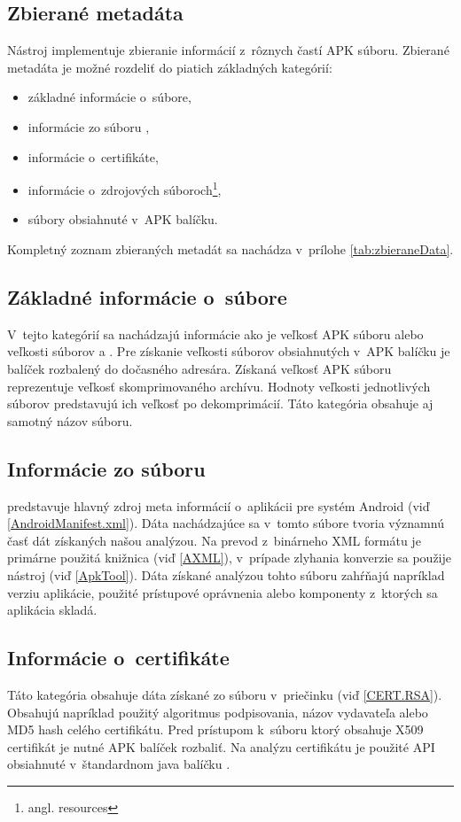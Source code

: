 \subsection{Zbierané metadáta}
Nástroj  implementuje zbieranie informácií z~rôznych častí APK súboru. Zbierané metadáta je možné rozdeliť do piatich základných kategórií:
\begin{itemize}
\item základné informácie o~súbore,
\item informácie zo súboru ,
\item informácie o~certifikáte,
\item informácie o~zdrojových súboroch\footnote{angl. resources},
\item súbory obsiahnuté v~APK balíčku.
\end{itemize}

\noindent Kompletný zoznam zbieraných metadát sa nachádza v~prílohe \ref{tab:zbieraneData}.

\subsection*{Základné informácie o~súbore} 
V~tejto kategórií sa nachádzajú informácie ako je veľkosť APK súboru alebo veľkosti súborov  a . Pre získanie veľkosti súborov obsiahnutých v~APK balíčku je balíček rozbalený do dočasného adresára. Získaná veľkosť APK súboru reprezentuje veľkosť skomprimovaného archívu. Hodnoty veľkosti jednotlivých súborov predstavujú ich veľkosť po dekomprimácií. Táto kategória obsahuje aj samotný názov súboru. 
\subsection*{Informácie zo súboru } 
 predstavuje hlavný zdroj meta informácií o~aplikácii pre systém Android (viď \ref{AndroidManifest.xml}). Dáta nachádzajúce sa v~tomto súbore tvoria významnú časť dát získaných našou analýzou. Na prevod z~binárneho XML formátu je primárne použitá knižnica  (viď \ref{AXML}), v~prípade zlyhania konverzie sa použije  nástroj  (viď \ref{ApkTool}). Dáta získané analýzou tohto súboru zahŕňajú napríklad verziu aplikácie, použité prístupové oprávnenia alebo komponenty z~ktorých sa aplikácia skladá.
\subsection*{Informácie o~certifikáte}
Táto kategória obsahuje dáta získané zo súboru  v~priečinku  (viď \ref{CERT.RSA}). Obsahujú napríklad použitý algoritmus podpisovania, názov vydavateľa alebo MD5 hash celého certifikátu. Pred prístupom k~súboru  ktorý obsahuje X509 certifikát je nutné APK balíček rozbaliť. Na analýzu certifikátu je použité API obsiahnuté v~štandardnom java balíčku .
